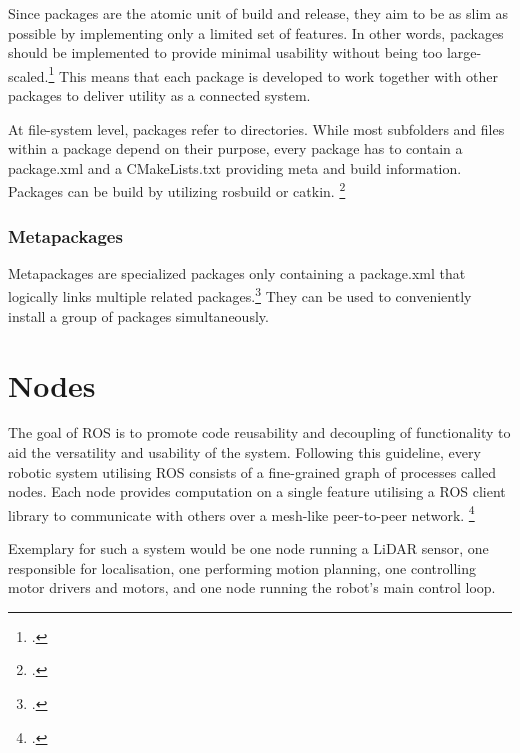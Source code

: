 Since packages are the atomic unit of build and release, they aim to be as slim as possible by implementing only a limited set of features. 
In other words, packages should be implemented to provide minimal usability without being too large-scaled.\footcite{openSourceRoboticsFoundationPackageNodate} This means that each package is developed to work together with other packages to deliver utility as a connected system.  

At file-system level, packages refer to directories. While most subfolders and files within a package depend on their purpose, every package has to contain a package.xml and a CMakeLists.txt providing meta and build information.
Packages can be build by utilizing rosbuild or catkin. \footcite{openSourceRoboticsFoundationBuildNodate}

\subsubsection{Metapackages} 
Metapackages are specialized packages only containing a package.xml that logically links multiple related packages.\footcite{openSourceRoboticsFoundationMetapackageNodate}
They can be used to conveniently install a group of packages simultaneously. %



\section{Nodes}
The goal of ROS is to promote code reusability and decoupling of functionality to aid the versatility and usability of the system. 
Following this guideline, every robotic system utilising ROS consists of a fine-grained graph of processes called nodes. Each node provides computation on a single feature utilising a ROS client library to communicate with others over a mesh-like peer-to-peer network. \footcite{openSourceRoboticsFoundationNodesNodate}

Exemplary for such a system would be one node running a LiDAR sensor, one responsible for localisation, one performing motion planning, one controlling motor drivers and motors, and one node running the robot's main control loop.


